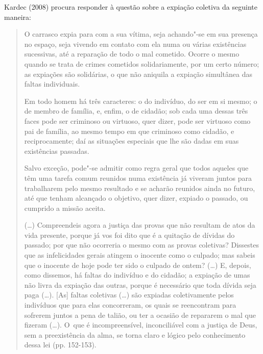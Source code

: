Kardec (2008) procura responder à questão sobre a expiação coletiva da
seguinte maneira:

\begin{quote}
O carrasco expia para com a sua vítima, seja achando"-se em sua presença
no espaço, seja vivendo em contato com ela numa ou várias existências
sucessivas, até a reparação de todo o mal cometido. Ocorre o mesmo
quando se trata de crimes cometidos solidariamente, por um certo número;
as expiações são solidárias, o que não aniquila a expiação simultânea
das faltas individuais.

\noindent Em todo homem há três caracteres: o do indivíduo, do ser em si mesmo; o
de membro de família, e, enfim, o de cidadão; sob cada uma dessas três
faces pode ser criminoso ou virtuoso, quer dizer, pode ser virtuoso como
pai de família, ao mesmo tempo em que criminoso como cidadão, e
reciprocamente; daí as situações especiais que lhe são dadas em suas
existências passadas.

\noindent Salvo exceção, pode"-se admitir como regra geral que todos aqueles que
têm uma tarefa comum reunidos numa existência já viveram juntos para
trabalharem pelo mesmo resultado e se acharão reunidos ainda no futuro,
até que tenham alcançado o objetivo, quer dizer, expiado o passado, ou
cumprido a missão aceita.

\noindent (\ldots{}) Compreendeis agora a justiça das provas que não resultam de
atos da vida presente, porque já vos foi dito que é a quitação de
dívidas do passado; por que não ocorreria o mesmo com as provas
coletivas? Dissestes que as infelicidades gerais atingem o inocente como
o culpado; mas sabeis que o inocente de hoje pode ter sido o culpado de
ontem? (\ldots{}) E, depois, como dissemos, há faltas do indivíduo e do
cidadão; a expiação de umas não livra da expiação das outras, porque é
necessário que toda dívida seja paga (\ldots{}). {[}As{]} faltas
coletivas (\ldots{}) são expiadas coletivamente pelos indivíduos que
para elas concorreram, os quais se reencontram para sofrerem juntos a
pena de talião, ou ter a ocasião de repararem o mal que fizeram
(\ldots{}). O~que é incompreensível, inconciliável com a justiça de
Deus, sem a preexistência da alma, se torna claro e lógico pelo
conhecimento dessa lei (pp. 152-153).
\end{quote}

